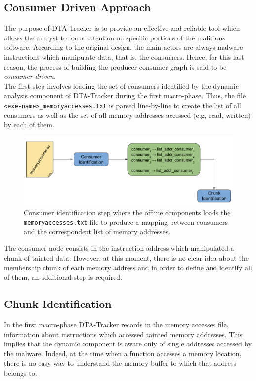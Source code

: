 \documentclass[LaM,binding=0.6cm]{sapthesis}
\begin{document}
\subsection{Consumer Driven Approach}
The purpose of DTA-Tracker is to provide an effective and reliable tool which allows the analyst to focus attention on specific portions of the malicious software. According to the original design, the main actors are always malware instructions which manipulate data, that is, the consumers. Hence, for this last reason, the process of building the producer-consumer graph is said to be \textit{consumer-driven}.\\

The first step involves loading the set of consumers identified by the dynamic analysis component of DTA-Tracker during the first macro-phase. Thus, the file \texttt{<exe-name>\_memoryaccesses.txt} is parsed line-by-line to create the list of all consumers as well as the set of all memory addresses accessed (e.g, read, written) by each of them.\\

\begin{figure}[h!]
\centering
\includegraphics[scale=.5]{images/dtatracker4}
\caption{Consumer identification step where the offline components loads the \texttt{memoryaccesses.txt} file to produce a mapping between consumers and the correspondent list of memory addresses.}
\end{figure}

The consumer node consists in the instruction address which manipulated a chunk of tainted data. However, at this moment, there is no clear idea about the membership chunk of each memory address and in order to define and identify all of them, an additional step is required.
\newpage
\subsection{Chunk Identification}
\label{subsec:chunkidentification}
In the first macro-phase DTA-Tracker records in the memory accesses file, information about instructions which accessed tainted memory addresses. This implies that the dynamic component is aware only of single addresses accessed by the malware. Indeed, at the time when a function accesses a memory location, there is no easy way to understand the memory buffer to which that address belongs to.\\
\end{document}
